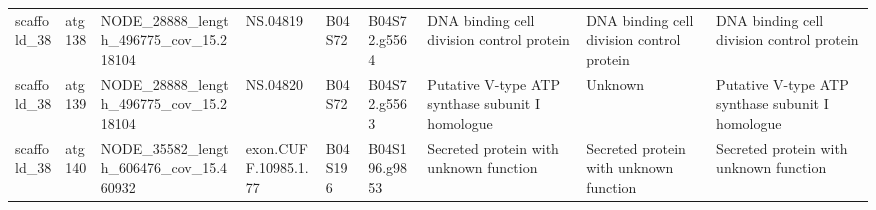 \begin{longtable}{lllllllll}
    scaffold\_38 &    atg138 &  NODE\_28888\_length\_496775\_cov\_15.218104 &              NS.04819 &       B04S72 &   B04S72.g5564 &          DNA binding cell division control protein &          DNA binding cell division control protein &          DNA binding cell division control protein \\
    scaffold\_38 &    atg139 &  NODE\_28888\_length\_496775\_cov\_15.218104 &              NS.04820 &       B04S72 &   B04S72.g5563 &   Putative V-type ATP synthase subunit I homologue &                                            Unknown &   Putative V-type ATP synthase subunit I homologue \\
    scaffold\_38 &    atg140 &  NODE\_35582\_length\_606476\_cov\_15.460932 &  exon.CUFF.10985.1.77 &      B04S196 &  B04S196.g9853 &             Secreted protein with unknown function &             Secreted protein with unknown function &             Secreted protein with unknown function \\
\end{longtable}
